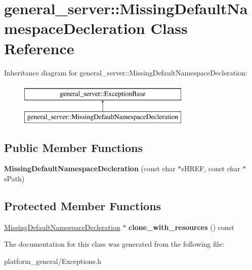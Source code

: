 \hypertarget{classgeneral__server_1_1MissingDefaultNamespaceDecleration}{\section{general\-\_\-server\-:\-:\-Missing\-Default\-Namespace\-Decleration \-Class \-Reference}
\label{classgeneral__server_1_1MissingDefaultNamespaceDecleration}
}
\-Inheritance diagram for general\-\_\-server\-:\-:\-Missing\-Default\-Namespace\-Decleration\-:\begin{figure}[H]
\begin{center}
\leavevmode
\includegraphics[height=2.000000cm]{classgeneral__server_1_1MissingDefaultNamespaceDecleration}
\end{center}
\end{figure}
\subsection*{\-Public \-Member \-Functions}
\begin{DoxyCompactItemize}
\item 
\hypertarget{classgeneral__server_1_1MissingDefaultNamespaceDecleration_a1b4d5e90e01438d6e5f2c264b61f61a1}{{\bfseries \-Missing\-Default\-Namespace\-Decleration} (const char $\ast$s\-H\-R\-E\-F, const char $\ast$s\-Path)}\label{classgeneral__server_1_1MissingDefaultNamespaceDecleration_a1b4d5e90e01438d6e5f2c264b61f61a1}

\end{DoxyCompactItemize}
\subsection*{\-Protected \-Member \-Functions}
\begin{DoxyCompactItemize}
\item 
\hypertarget{classgeneral__server_1_1MissingDefaultNamespaceDecleration_a0ac9556ab7e60b9d968587565a750a0c}{\hyperlink{classgeneral__server_1_1MissingDefaultNamespaceDecleration}{\-Missing\-Default\-Namespace\-Decleration} $\ast$ {\bfseries clone\-\_\-with\-\_\-resources} () const }\label{classgeneral__server_1_1MissingDefaultNamespaceDecleration_a0ac9556ab7e60b9d968587565a750a0c}

\end{DoxyCompactItemize}


\-The documentation for this class was generated from the following file\-:\begin{DoxyCompactItemize}
\item 
platform\-\_\-general/\-Exceptions.\-h\end{DoxyCompactItemize}
